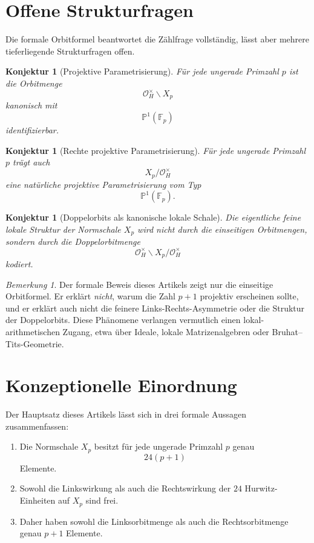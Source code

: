 \documentclass[12pt,a4paper]{article}
\theoremstyle{plain}
\newtheorem{konjektur}[satz]{Konjektur}
\theoremstyle{definition}
\theoremstyle{remark}
\newtheorem{bemerkung}[satz]{Bemerkung}
\newcommand{\OH}{\mathcal O_H}
\newcommand{\Fp}{\mathbb F_p}
\newcommand{\PP}{\mathbb P}
\begin{document}
	\section{Offene Strukturfragen}
	
	Die formale Orbitformel beantwortet die Zählfrage vollständig, lässt aber mehrere tieferliegende Strukturfragen offen.
	
	\begin{konjektur}[Projektive Parametrisierung]
		Für jede ungerade Primzahl \(p\) ist die Orbitmenge
		\[
		\OH^\times\backslash X_p
		\]
		kanonisch mit
		\[
		\PP^1(\Fp)
		\]
		identifizierbar.
	\end{konjektur}
	
	\begin{konjektur}[Rechte projektive Parametrisierung]
		Für jede ungerade Primzahl \(p\) trägt auch
		\[
		X_p/\OH^\times
		\]
		eine natürliche projektive Parametrisierung vom Typ
		\[
		\PP^1(\Fp).
		\]
	\end{konjektur}
	
	\begin{konjektur}[Doppelorbits als kanonische lokale Schale]
		Die eigentliche feine lokale Struktur der Normschale \(X_p\) wird nicht durch die einseitigen Orbitmengen, sondern durch die Doppelorbitmenge
		\[
		\OH^\times\backslash X_p/\OH^\times
		\]
		kodiert.
	\end{konjektur}
	
	\begin{bemerkung}
		Der formale Beweis dieses Artikels zeigt nur die einseitige Orbitformel. Er erklärt \emph{nicht}, warum die Zahl \(p+1\) projektiv erscheinen sollte, und er erklärt auch nicht die feinere Links-Rechts-Asymmetrie oder die Struktur der Doppelorbits. Diese Phänomene verlangen vermutlich einen lokal-arithmetischen Zugang, etwa über Ideale, lokale Matrizenalgebren oder Bruhat--Tits-Geometrie.
	\end{bemerkung}
	
	\section{Konzeptionelle Einordnung}
	
	Der Hauptsatz dieses Artikels lässt sich in drei formale Aussagen zusammenfassen:
	
	\begin{enumerate}
		\item Die Normschale \(X_p\) besitzt für jede ungerade Primzahl \(p\) genau
		\[
		24(p+1)
		\]
		Elemente.
		
		\item Sowohl die Linkswirkung als auch die Rechtswirkung der \(24\) Hurwitz-Einheiten auf \(X_p\) sind frei.
		
		\item Daher haben sowohl die Linksorbitmenge als auch die Rechtsorbitmenge genau \(p+1\) Elemente.
	\end{enumerate}
	
\end{document}

